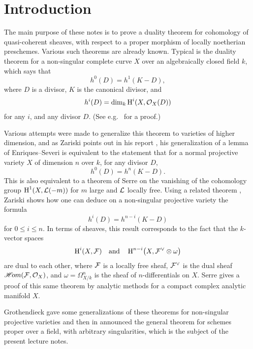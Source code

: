 \chapter*{Introduction}\label{chap:introduction}
\begingroup
\setlength{\emergencystretch}{2em}
\bigskip
The main purpose of these notes is to prove a duality theorem for cohomology of quasi-coherent sheaves, with respect to a proper morphism of locally noetherian preschemes. Various such theorems are already known. Typical is the duality theorem for a non-singular complete curve $X$ over an algebraically closed field $k$, which says that
\[
h^{0}(D)=h^{1}(K-D),
\]
where $D$ is a divisor, $K$ is the canonical divisor, and
\[
h^{i}(D)=\dim_{k} \operatorname{H}^{i}(X, \mathcal{O}_{X}(D))
\]
for any $i$, and any divisor $D$. (See e.g.~\cite[\nopp Ch.~II]{16} for a proof.)

Various attempts were made to generalize this theorem to varieties of higher dimension, and as Zariski points out in his report \cite{20}, his generalization of a lemma of Enriques--Severi \cite{19} is equivalent to the statement that for a normal projective variety $X$ of dimension $n$ over $k$, for any divisor $D$,
\[
h^{0}(D)=h^{n}(K-D).
\]
This is also equivalent to a theorem of Serre \cite[\nopp \S76, Thm.~4]{FAC}
on the vanishing of the cohomology group $\operatorname{H}^{1}(X, \mathcal{L}(-m))$ for $m$ large and $\mathcal{L}$ locally free. Using a related theorem \cite[\nopp \S75, Thm.~3]{FAC}, Zariski shows how one can deduce on a non-singular projective variety the formula
\[
h^{i}(D)=h^{n-i}(K-D)
\]
for $0\leq i\leq n$. In terms of sheaves, this result corresponds to the fact that the $k$-vector spaces
\[
\operatorname{H}^{i}(X, \mathcal{F}) \quad\text{and}\quad \operatorname{H}^{n-i}\bigl(X, \mathcal{F}^{\vee}\otimes\omega\bigr)
\]
are dual to each other, where $\mathcal{F}$ is a locally free sheaf, $\mathcal{F}^{\vee}$ is the dual sheaf $\mathop{\mathscr{H}\!om}\nolimits(\mathcal{F},\mathcal{O}_{X})$,
 and $\omega=\Omega_{X/k}^{n}$ is the sheaf of $n$-differentials on $X$. Serre \cite{15} gives a proof of this same theorem by analytic methods for a compact complex analytic manifold $X$.

Grothendieck \cite{8} gave some generalizations of these theorems for non-singular projective varieties and then in \cite{9} announced the general theorem for schemes proper over a field, with arbitrary singularities, which is the subject of the present lecture notes.

